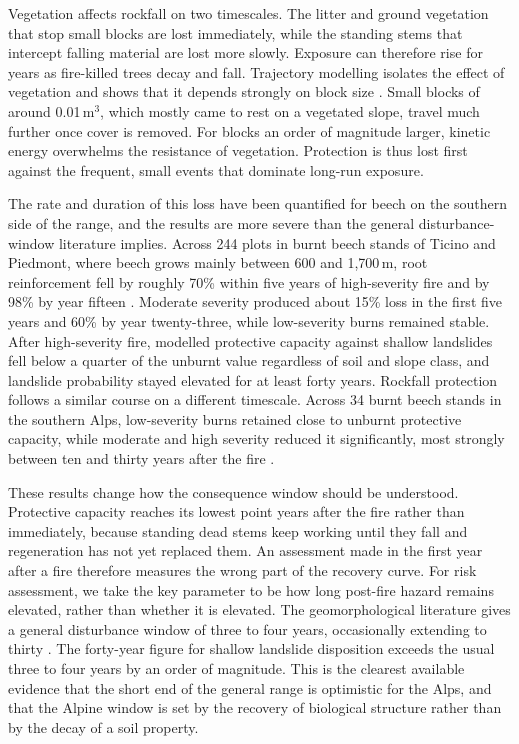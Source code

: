 \documentclass[11pt,a4paper]{article}
\begin{document}
Vegetation affects rockfall on two timescales. The litter and ground vegetation that stop small blocks are lost immediately, while the standing stems that intercept falling material are lost more slowly. Exposure can therefore rise for years as fire-killed trees decay and fall. Trajectory modelling isolates the effect of vegetation and shows that it depends strongly on block size \citep{asteriou_assessing_2025}. Small blocks of around 0.01\,m$^3$, which mostly came to rest on a vegetated slope, travel much further once cover is removed. For blocks an order of magnitude larger, kinetic energy overwhelms the resistance of vegetation. Protection is thus lost first against the frequent, small events that dominate long-run exposure.

The rate and duration of this loss have been quantified for beech on the southern side of the range, and the results are more severe than the general disturbance-window literature implies. Across 244 plots in burnt beech stands of Ticino and Piedmont, where beech grows mainly between 600 and 1{,}700\,m, root reinforcement fell by roughly 70\% within five years of high-severity fire and by 98\% by year fifteen \citep{gehring_shallow_2019}. Moderate severity produced about 15\% loss in the first five years and 60\% by year twenty-three, while low-severity burns remained stable. After high-severity fire, modelled protective capacity against shallow landslides fell below a quarter of the unburnt value regardless of soil and slope class, and landslide probability stayed elevated for at least forty years. Rockfall protection follows a similar course on a different timescale. Across 34 burnt beech stands in the southern Alps, low-severity burns retained close to unburnt protective capacity, while moderate and high severity reduced it significantly, most strongly between ten and thirty years after the fire \citep{maringer_temporal_2016}.

These results change how the consequence window should be understood. Protective capacity reaches its lowest point years after the fire rather than immediately, because standing dead stems keep working until they fall and regeneration has not yet replaced them. An assessment made in the first year after a fire therefore measures the wrong part of the recovery curve. For risk assessment, we take the key parameter to be how long post-fire hazard remains elevated, rather than whether it is elevated. The geomorphological literature gives a general disturbance window of three to four years, occasionally extending to thirty \citep{santi_wildfire_2022}. The forty-year figure for shallow landslide disposition exceeds the usual three to four years by an order of magnitude. This is the clearest available evidence that the short end of the general range is optimistic for the Alps, and that the Alpine window is set by the recovery of biological structure rather than by the decay of a soil property.
\end{document}
